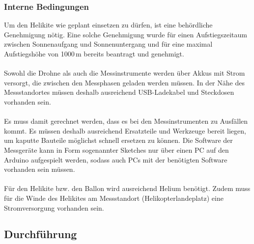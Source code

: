 \documentclass[a4paper,11pt,DIV=calc,tablecaptionabove,headinclude,twoside]{article}
\begin{document}
\subsubsection{Interne Bedingungen}

Um den Helikite wie geplant einsetzen zu dürfen, ist eine behördliche Genehmigung nötig. Eine solche Genehmigung wurde für einen Aufstiegszeitaum zwischen Sonnenaufgang und Sonnenuntergang und für eine maximal Aufstiegshöhe von 1000\,m bereits beantragt und genehmigt.\\\\
Sowohl die Drohne als auch die Messinstrumente werden über Akkus mit Strom versorgt, die zwischen den Messphasen geladen werden müssen. In der Nähe des Messstandortes müssen deshalb ausreichend USB-Ladekabel und Steckdosen vorhanden sein.\\\\
Es muss damit gerechnet werden, dass es bei den Messinstrumenten zu Ausfällen kommt. Es müssen deshalb ausreichend Ersatzteile und Werkzeuge bereit liegen, um kaputte Bauteile möglichst schnell ersetzen zu können. Die Software der Messgeräte kann in Form sogenannter Sketches nur über einen PC auf den Arduino aufgespielt werden, sodass auch PCs mit der benötigten Software vorhanden sein müssen.\\\\
Für den Helikite bzw. den Ballon wird ausreichend Helium benötigt. Zudem muss für die Winde des Helikites am Messstandort (Helikopterlandeplatz) eine Stromversorgung vorhanden sein.

\subsection{Durchführung}
\label{sec:Durchfuehrung}
\end{document}
